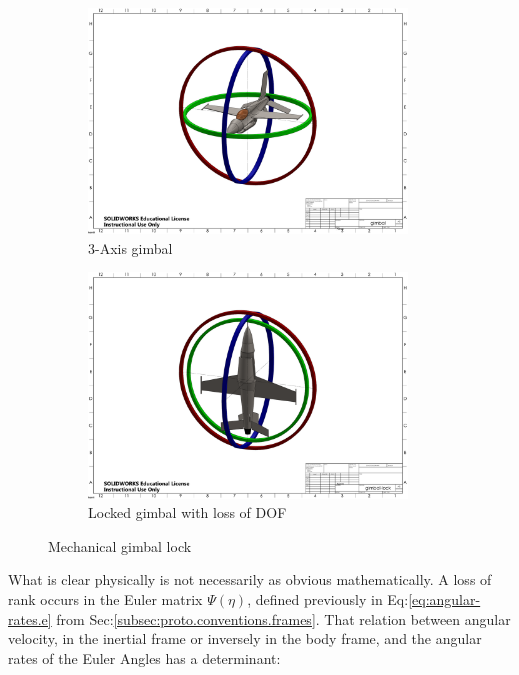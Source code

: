 \begin{figure}[htbp]
\begin{subfigure}{0.5\textwidth}
\centering
\includegraphics[clip, trim=16.5cm 8.5cm 16.5cm 6.7cm, width=0.93\textwidth]{pdfpages/gimbal}
\caption{3-Axis gimbal}
\label{fig:gimbal}
\end{subfigure}
\begin{subfigure}{0.5\textwidth}
\centering
\includegraphics[clip, trim=16.5cm 8.5cm 16.5cm 6.7cm, width=0.93\textwidth]{pdfpages/gimbal-lock}
\caption{Locked gimbal with loss of DOF}
\label{fig:gimbal-lock}
\end{subfigure}
\caption{Mechanical gimbal lock}
\vspace{-10pt}
\end{figure} 
\par
What is clear physically is not necessarily as obvious mathematically. A loss of rank occurs in the Euler matrix $\Psi(\eta)$, defined previously in Eq:\ref{eq:angular-rates.e} from Sec:\ref{subsec:proto.conventions.frames}. That relation between angular velocity, in the inertial frame or inversely in the body frame, and the angular rates of the Euler Angles has a determinant:
